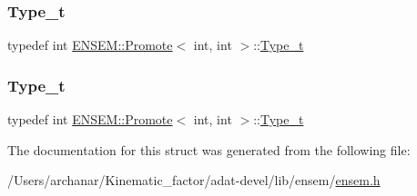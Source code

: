 \subsubsection{\texorpdfstring{Type\_t}{Type\_t}\hspace{0.1cm}{\footnotesize\ttfamily [2/3]}}
{\footnotesize\ttfamily typedef int \mbox{\hyperlink{structENSEM_1_1Promote}{E\+N\+S\+E\+M\+::\+Promote}}$<$ int, int $>$\+::\mbox{\hyperlink{structENSEM_1_1Promote_3_01int_00_01int_01_4_ad314c2e73c9d5431718e02d851a4322b}{Type\+\_\+t}}}

\mbox{\label{structENSEM_1_1Promote_3_01int_00_01int_01_4_ad314c2e73c9d5431718e02d851a4322b}} 
\subsubsection{\texorpdfstring{Type\_t}{Type\_t}\hspace{0.1cm}{\footnotesize\ttfamily [3/3]}}
{\footnotesize\ttfamily typedef int \mbox{\hyperlink{structENSEM_1_1Promote}{E\+N\+S\+E\+M\+::\+Promote}}$<$ int, int $>$\+::\mbox{\hyperlink{structENSEM_1_1Promote_3_01int_00_01int_01_4_ad314c2e73c9d5431718e02d851a4322b}{Type\+\_\+t}}}



The documentation for this struct was generated from the following file\+:\begin{DoxyCompactItemize}
\item 
/\+Users/archanar/\+Kinematic\+\_\+factor/adat-\/devel/lib/ensem/\mbox{\hyperlink{adat-devel_2lib_2ensem_2ensem_8h}{ensem.\+h}}\end{DoxyCompactItemize}
